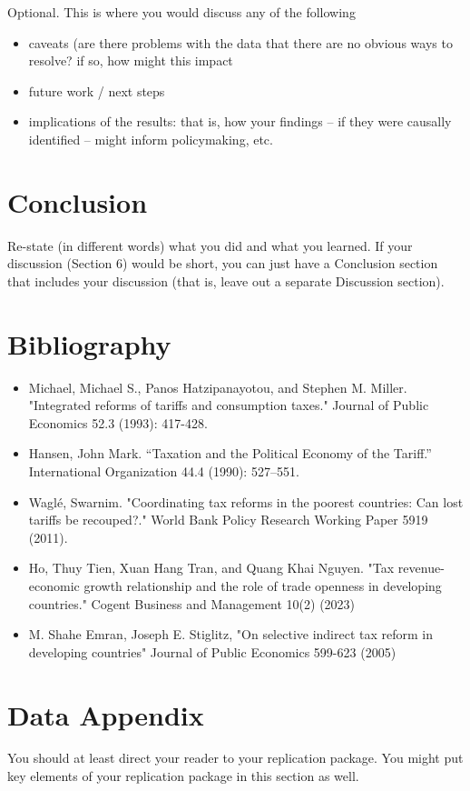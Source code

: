 \documentclass[12pt]{article}
\begin{document}
Optional. This is where you would discuss any of the following
\begin{itemize}
    \item caveats (are there problems with the data that there are no obvious ways to resolve? if so, how might this impact
    \item future work / next steps
    \item implications of the results: that is, how your findings -- if they were causally identified -- might inform policymaking, etc.
\end{itemize}

\section{Conclusion}
\label{sec:conclusion}

Re-state (in different words) what you did and what you learned. If your discussion (Section 6) would be short, you can just have a Conclusion section that includes your discussion (that is, leave out a separate Discussion section).

\newpage
\section*{Bibliography}
\singlespacing
\setlength\bibsep{0pt}

\begin{itemize}
\item Michael, Michael S., Panos Hatzipanayotou, and Stephen M. Miller. "Integrated reforms of tariffs and consumption taxes." Journal of Public Economics 52.3 (1993): 417-428.
\item Hansen, John Mark. “Taxation and the Political Economy of the Tariff.” International Organization 44.4 (1990): 527–551.
\item Waglé, Swarnim. "Coordinating tax reforms in the poorest countries: Can lost tariffs be recouped?." World Bank Policy Research Working Paper 5919 (2011).
\item Ho, Thuy Tien, Xuan Hang Tran, and Quang Khai Nguyen. "Tax revenue-economic growth relationship and the role of trade openness in developing countries." Cogent Business and Management 10(2) (2023)
\item M. Shahe Emran, Joseph E. Stiglitz, "On selective indirect tax reform in developing countries" Journal of Public Economics 599-623 (2005)
\end{itemize}










\newpage
\section*{Data Appendix} \label{sec:appendixa}

You should at least direct your reader to your replication package. You might put key elements of your replication package in this section as well.
\end{document}
